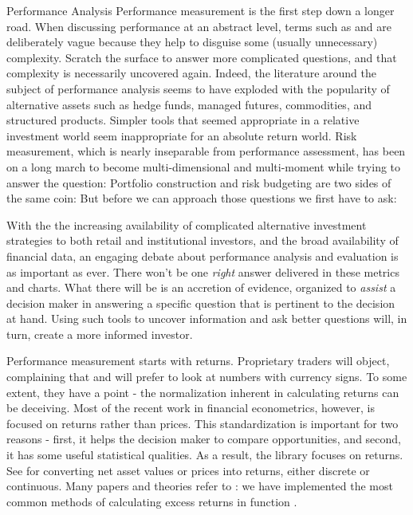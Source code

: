 \documentclass[12pt,letterpaper,english]{article}
\begin{document}
\begin{Section}{Performance Analysis}
Performance measurement is the first step down a longer road.  When discussing performance at an abstract level, terms such as  and  are deliberately vague because they help to disguise some (usually unnecessary) complexity.  Scratch the surface to answer more complicated questions, and that complexity is necessarily uncovered again.  Indeed, the literature around the subject of performance analysis seems to have exploded with the popularity of alternative assets such as hedge funds, managed futures, commodities, and structured products. Simpler tools that seemed appropriate in a relative investment world seem inappropriate for an absolute return world.  Risk measurement, which is nearly inseparable from performance assessment, has been on a long march to become multi-dimensional and multi-moment while trying to answer the question:   Portfolio construction and risk budgeting are two sides of the same coin:   But before we can approach those questions we first have to ask: 

With the the increasing availability of complicated alternative investment strategies to both retail and institutional investors, and the broad availability of financial data, an engaging debate about performance analysis and evaluation is as important as ever.  There won't be one \emph{right} answer delivered in these metrics and charts.  What there will be is an accretion of evidence, organized to \emph{assist} a decision maker in answering a specific question that is pertinent to the decision at hand.  Using such tools to uncover information and ask better questions will, in turn, create a more informed investor.

Performance measurement starts with returns.  Proprietary traders will object, complaining that  and will prefer to look at numbers with currency signs.  To some extent, they have a point - the normalization inherent in calculating returns can be deceiving.  Most of the recent work in financial econometrics, however, is focused on returns rather than prices.  This  standardization is important for two reasons - first, it helps the decision maker to compare opportunities, and second, it has some useful statistical qualities.  As a result, the  library focuses on returns.  See  for converting net asset values or prices into returns, either discrete or continuous.  Many papers and theories refer to : we have implemented the most common methods of calculating excess returns in function .


\end{Section}
\end{document}
